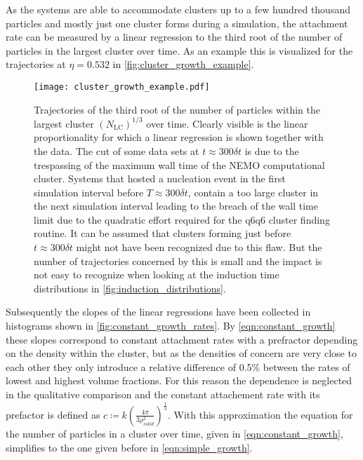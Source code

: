 As the systems are able to accommodate clusters up to a few hundred thousand particles and mostly just one cluster forms during a simulation, the attachment rate can be measured by a linear regression to the third root of the number of particles in the largest cluster over time. As an example this is visualized for the trajectories at $\eta=0.532$ in \autoref{fig:cluster_growth_example}.

\begin{figure}[ht]
\centering
\texttt{[image: cluster\_growth\_example.pdf]}
\caption[Largest cluster trajectories from production data with constant attachment rates]{Trajectories of the third root of the number of particles within the largest cluster $(N_{\text{LC}})^{1/3}$ over time. Clearly visible is the linear proportionality for which a linear regression is shown together with the data. The cut of some data sets at $t \approx 300 \delta t $ is due to the trespassing of the maximum wall time of the NEMO computational cluster. Systems that hosted a nucleation event in the first simulation interval before $T \approx 300\delta t  $, contain a too large cluster in the next simulation interval leading to the breach of the wall time limit due to the quadratic effort required for the q6q6 cluster finding routine. It can be assumed that clusters forming just before $t \approx 300 \delta t$ might not have been recognized due to this flaw. But the number of trajectories concerned by this is small and the impact is not easy to recognize when looking at the induction time distributions in \autoref{fig:induction_distributions}.}
\label{fig:cluster_growth_example}
\end{figure}

Subsequently the slopes of the linear regressions have been collected in histograms shown in \autoref{fig:constant_growth_rates}. By \autoref{eqn:constant_growth} these slopes correspond to constant attachment rates with a prefractor depending on the density within the cluster, but as the densities of concern are very close to each other they only introduce a relative difference of 0.5\% between the rates of lowest and highest volume fractions. For this reason the dependence is neglected in the qualitative comparison and the constant attachement rate with its prefactor is defined as $ c \coloneqq k \left( \frac{4 \pi}{3 \rho_{solid}^2} \right)^\frac{1}{3} $. With this approximation the equation for the number of particles in a cluster over time, given in \autoref{eqn:constant_growth}, simplifies to the one given before in \autoref{eqn:simple_growth}.\\ 

